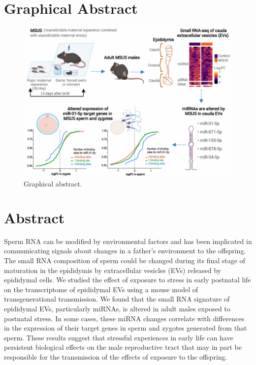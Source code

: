 \documentclass[12pt,twoside]{reedthesis}
\begin{document}
\newpage

\hypertarget{graphical-abstract-1}{%
\section{Graphical Abstract}\label{graphical-abstract-1}}
\begin{figure}[htbp]

{\centering \includegraphics{thesis_files/figure-latex/cf1-1} 

}

\caption[Graphical abstract]{Graphical abstract.}\label{fig:cf1}
\end{figure}
\newpage

\hypertarget{abstract-1}{%
\section{Abstract}\label{abstract-1}}

Sperm RNA can be modified by environmental factors and has been
implicated in communicating signals about changes in a father's
environment to the offspring. The small RNA composition of sperm could
be changed during its final stage of maturation in the epididymis by
extracellular vesicles (EVs) released by epididymal cells. We studied
the effect of exposure to stress in early postnatal life on the
transcriptome of epididymal EVs using a mouse model of transgenerational
transmission. We found that the small RNA signature of epididymal EVs,
particularly miRNAs, is altered in adult males exposed to postnatal
stress. In some cases, these miRNA changes correlate with differences in
the expression of their target genes in sperm and zygotes generated from
that sperm. These results suggest that stressful experiences in early
life can have persistent biological effects on the male reproductive
tract that may in part be responsible for the transmission of the
effects of exposure to the offspring.
\end{document}
